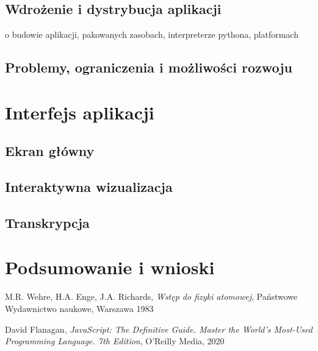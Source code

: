 \documentclass{SGGW-thesis}
\begin{document}
	\section{Wdrożenie i dystrybucja aplikacji}
	o budowie aplikacji, pakowanych zasobach, interpreterze pythona, platformach
	\section{Problemy, ograniczenia i możliwości rozwoju}

\chapter{Interfejs aplikacji}
	\section{Ekran główny}
	\section{Interaktywna wizualizacja}
	\section{Transkrypcja}
	
\chapter{Podsumowanie i wnioski}


\begin{thebibliography}{9}
	M.R. Wehre, H.A. Enge, J.A. Richards,
	\textit{Wstęp do fizyki atomowej}, 
	Państwowe Wydawnictwo naukowe, Warszawa 1983
	
	David Flanagan, 
	\textit{JavaScript: The Definitive Guide. Master the World's Most-Used Programming Language. 7th Edition}, 
	O'Reilly Media, 2020
	
	
\end{thebibliography}

\beforelastpage
\end{document}
